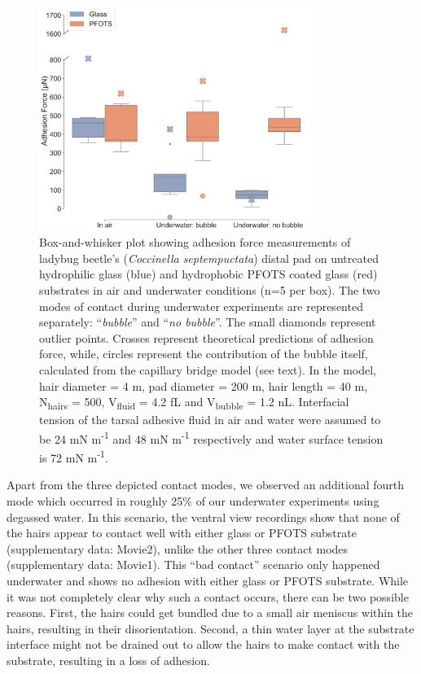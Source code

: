 \documentclass[vruler,JEB]{COB}%
\begin{document}
\begin{figure}
\includegraphics[width=3.5in]{Figure2-Expt_effect_of_contact}\caption{\label{fig:Effect-of-contact}Box-and-whisker plot showing
 adhesion force measurements of ladybug beetle's (\emph{Coccinella
septempuctata}) distal pad on untreated hydrophilic glass (blue) and hydrophobic PFOTS coated glass (red) substrates in air and underwater
conditions (n=5 per box). The two modes of contact during underwater experiments
are represented separately: \textquotedblleft\emph{bubble}\textquotedblright{}
and \textquotedblleft\emph{no bubble}\textquotedblright . The small diamonds represent outlier points. Crosses
represent theoretical predictions of adhesion force, while, circles
represent the contribution of the bubble itself, calculated from the
capillary bridge model (see text). In the model, hair diameter = 4 \textmu m,
pad diameter = 200 \textmu m, hair length = 40 \textmu m,
N\protect\textsubscript{hairs} = 500, V\protect\textsubscript{fluid}
= 4.2 fL and V\protect\textsubscript{bubble} = 1.2 nL. Interfacial
tension of the tarsal adhesive fluid in air and water were assumed to be
24 mN m\protect\textsuperscript{-1} and 48 mN m\protect\textsuperscript{-1} respectively and water surface tension is 72 mN m\protect\textsuperscript{-1}.}
\end{figure}

Apart from the three depicted contact modes, we observed an additional
fourth mode which occurred in roughly 25\% of our underwater experiments using degassed water.
In this scenario, the ventral view recordings show that none of the hairs
appear to contact well with either glass or PFOTS substrate (supplementary data: Movie2), unlike the other
three contact modes (supplementary data: Movie1). This ``bad contact'' scenario only happened underwater and shows no adhesion 
with either glass or PFOTS substrate. While it was not completely
clear why such a contact occurs, there can be two possible reasons.
First, the hairs could get bundled due to a small air meniscus within
the hairs, resulting in their disorientation. Second, a thin water
layer at the substrate interface might not be drained out to allow
the hairs to make contact with the substrate, resulting in a loss
of adhesion.
\end{document}
